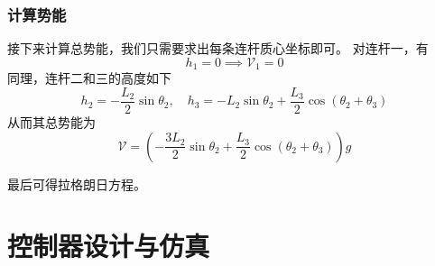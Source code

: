 \documentclass{ctexart}
\begin{document}
\subsubsection{计算势能}

接下来计算总势能，我们只需要求出每条连杆质心坐标即可。
对连杆一，有
\[ h_1 = 0 \implies \mathcal V_1 = 0\]
同理，连杆二和三的高度如下
\[
    h_2 = - \frac{L_2}{2} \sin \theta_2,\quad h_3 = - L_2 \sin \theta_2 + \frac{L_3}{2} \cos(\theta_2+\theta_3)
\]
从而其总势能为
\[
    \mathcal V = (- \frac{3L_2}{2} \sin \theta_2 + \frac{L_3}{2} \cos(\theta_2+\theta_3))g
\]

最后可得拉格朗日方程。

\section{控制器设计与仿真}
\end{document}
